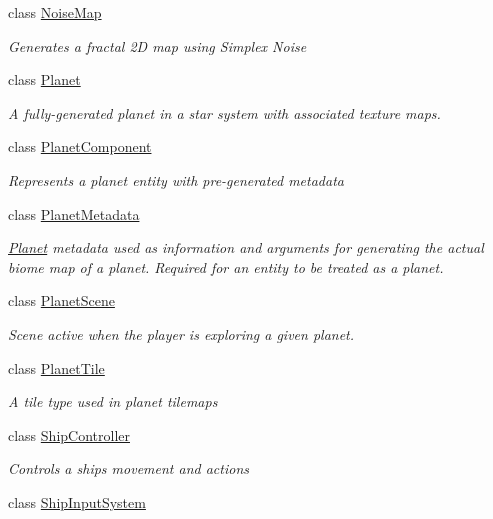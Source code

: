 \begin{DoxyCompactItemize}
class \hyperlink{class_midnight_blue_1_1_noise_map}{Noise\+Map}
\begin{DoxyCompactList}\small\item\em Generates a fractal 2D map using Simplex Noise \end{DoxyCompactList}\item 
class \hyperlink{class_midnight_blue_1_1_planet}{Planet}
\begin{DoxyCompactList}\small\item\em A fully-\/generated planet in a star system with associated texture maps. \end{DoxyCompactList}\item 
class \hyperlink{class_midnight_blue_1_1_planet_component}{Planet\+Component}
\begin{DoxyCompactList}\small\item\em Represents a planet entity with pre-\/generated metadata \end{DoxyCompactList}\item 
class \hyperlink{class_midnight_blue_1_1_planet_metadata}{Planet\+Metadata}
\begin{DoxyCompactList}\small\item\em \hyperlink{class_midnight_blue_1_1_planet}{Planet} metadata used as information and arguments for generating the actual biome map of a planet. Required for an entity to be treated as a planet. \end{DoxyCompactList}\item 
class \hyperlink{class_midnight_blue_1_1_planet_scene}{Planet\+Scene}
\begin{DoxyCompactList}\small\item\em Scene active when the player is exploring a given planet. \end{DoxyCompactList}\item 
class \hyperlink{class_midnight_blue_1_1_planet_tile}{Planet\+Tile}
\begin{DoxyCompactList}\small\item\em A tile type used in planet tilemaps \end{DoxyCompactList}\item 
class \hyperlink{class_midnight_blue_1_1_ship_controller}{Ship\+Controller}
\begin{DoxyCompactList}\small\item\em Controls a ships movement and actions \end{DoxyCompactList}\item 
class \hyperlink{class_midnight_blue_1_1_ship_input_system}{Ship\+Input\+System}

\end{DoxyCompactItemize}
